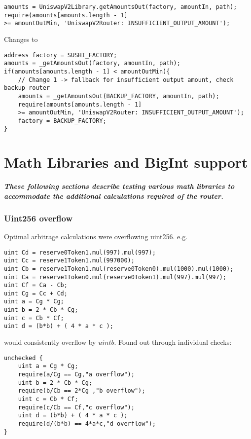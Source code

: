 \documentclass[runningheads]{llncs}
\begin{document}
\label{Fallback Factory:4}
\begin{verbatim}
amounts = UniswapV2Library.getAmountsOut(factory, amountIn, path);
require(amounts[amounts.length - 1]
>= amountOutMin, 'UniswapV2Router: INSUFFICIENT_OUTPUT_AMOUNT');
\end{verbatim}
Changes to
\begin{verbatim}
address factory = SUSHI_FACTORY;
amounts = _getAmountsOut(factory, amountIn, path);
if(amounts[amounts.length - 1] < amountOutMin){
    // Change 1 -> fallback for insufficient output amount, check backup router
    amounts = _getAmountsOut(BACKUP_FACTORY, amountIn, path);
    require(amounts[amounts.length - 1] 
    >= amountOutMin, 'UniswapV2Router: INSUFFICIENT_OUTPUT_AMOUNT');
    factory = BACKUP_FACTORY;
}
\end{verbatim}

\chapter{Math Libraries and BigInt support}

\paragraph{These following sections describe testing various math libraries to accommodate the additional calculations required of the router.}

\subsection{Uint256 overflow}
Optimal arbitrage calculations were overflowing uint256. e.g.
\label{Uint256 overflow:5}
\begin{verbatim}
uint Cd = reserve0Token1.mul(997).mul(997);
uint Cc = reserve1Token1.mul(997000);
uint Cb = reserve1Token1.mul(reserve0Token0).mul(1000).mul(1000);
uint Ca = reserve1Token0.mul(reserve0Token1).mul(997).mul(997);
uint Cf = Ca - Cb;
uint Cg = Cc + Cd;
uint a = Cg * Cg;
uint b = 2 * Cb * Cg;
uint c = Cb * Cf;
uint d = (b*b) + ( 4 * a * c ); 
\end{verbatim}

would consistently overflow by $uint b$. Found out through individual checks:
\begin{verbatim}
unchecked {
    uint a = Cg * Cg;
    require(a/Cg == Cg,"a overflow");
    uint b = 2 * Cb * Cg;
    require(b/Cb == 2*Cg ,"b overflow");
    uint c = Cb * Cf;
    require(c/Cb == Cf,"c overflow");
    uint d = (b*b) + ( 4 * a * c );
    require(d/(b*b) == 4*a*c,"d overflow");
}
\end{verbatim}
\newpage
\end{document}
